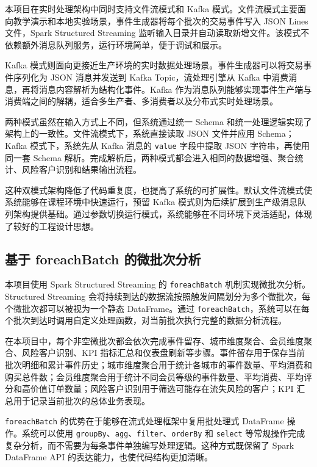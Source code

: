 \documentclass[12pt,hyperref,a4paper,UTF8]{ctexart}
\begin{document}
本项目在实时处理架构中同时支持文件流模式和 Kafka 模式。文件流模式主要面向教学演示和本地实验场景，事件生成器将每个批次的交易事件写入 JSON Lines 文件，Spark Structured Streaming 监听输入目录并自动读取新增文件。该模式不依赖额外消息队列服务，运行环境简单，便于调试和展示。

Kafka 模式则面向更接近生产环境的实时数据处理场景。事件生成器可以将交易事件序列化为 JSON 消息并发送到 Kafka Topic，流处理引擎从 Kafka 中消费消息，再将消息内容解析为结构化事件。Kafka 作为消息队列能够实现事件生产端与消费端之间的解耦，适合多生产者、多消费者以及分布式实时处理场景。

两种模式虽然在输入方式上不同，但系统通过统一 Schema 和统一处理逻辑实现了架构上的一致性。文件流模式下，系统直接读取 JSON 文件并应用 Schema；Kafka 模式下，系统先从 Kafka 消息的 \texttt{value} 字段中提取 JSON 字符串，再使用同一套 Schema 解析。完成解析后，两种模式都会进入相同的数据增强、聚合统计、风险客户识别和结果输出流程。

这种双模式架构降低了代码重复度，也提高了系统的可扩展性。默认文件流模式使系统能够在课程环境中快速运行，预留 Kafka 模式则为后续扩展到生产级消息队列架构提供基础。通过参数切换运行模式，系统能够在不同环境下灵活适配，体现了较好的工程设计思想。

\subsection{基于 foreachBatch 的微批次分析}

本项目使用 Spark Structured Streaming 的 \texttt{foreachBatch} 机制实现微批次分析。Structured Streaming 会将持续到达的数据流按照触发间隔划分为多个微批次，每个微批次都可以被视为一个静态 DataFrame。通过 \texttt{foreachBatch}，系统可以在每个批次到达时调用自定义处理函数，对当前批次执行完整的数据分析流程。

在本项目中，每个非空微批次都会依次完成事件留存、城市维度聚合、会员维度聚合、风险客户识别、KPI 指标汇总和仪表盘刷新等步骤。事件留存用于保存当前批次明细和累计事件历史；城市维度聚合用于统计各城市的事件数量、平均消费和购买总件数；会员维度聚合用于统计不同会员等级的事件数量、平均消费、平均评分和高价值订单数量；风险客户识别用于筛选可能存在流失风险的客户；KPI 汇总用于记录当前批次的总体业务表现。

\texttt{foreachBatch} 的优势在于能够在流式处理框架中复用批处理式 DataFrame 操作。系统可以使用 \texttt{groupBy}、\texttt{agg}、\texttt{filter}、\texttt{orderBy} 和 \texttt{select} 等常规操作完成复杂分析，而不需要为每条事件单独编写处理逻辑。这种方式既保留了 Spark DataFrame API 的表达能力，也使代码结构更加清晰。
\end{document}
